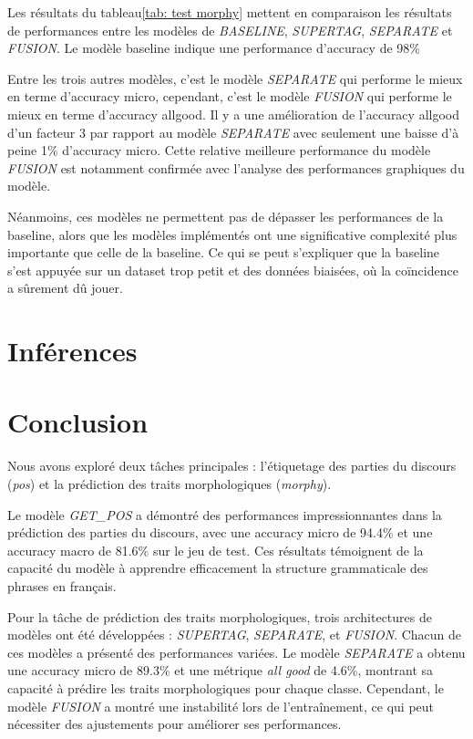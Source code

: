 \documentclass[a4paper]{article}
\begin{document}
Les résultats du tableau\ref{tab: test morphy} mettent en comparaison les résultats de performances entre les modèles de \textit{BASELINE}, \textit{SUPERTAG}, \textit{SEPARATE} et \textit{FUSION}. Le modèle baseline indique une performance d'accuracy de 98\% 

Entre les trois autres modèles, c'est le modèle \textit{SEPARATE} qui performe le mieux en terme d'accuracy micro, cependant, c'est le modèle \textit{FUSION} qui performe le mieux en terme d'accuracy allgood. Il y a une amélioration de l'accuracy allgood d'un facteur 3 par rapport au modèle \textit{SEPARATE} avec seulement une baisse d'à peine 1\% d'accuracy micro. Cette relative meilleure performance du modèle \textit{FUSION} est notamment confirmée avec l'analyse des performances graphiques du modèle. 

Néanmoins, ces modèles ne permettent pas de dépasser les performances de la baseline, alors que les modèles implémentés ont une significative complexité plus importante que celle de la baseline. Ce qui se peut s'expliquer que la baseline s'est appuyée sur un dataset trop petit et des données biaisées, où la coïncidence a sûrement dû jouer. 

\section{Inférences}

\newpage

\section{Conclusion}

Nous avons exploré deux tâches principales : l'étiquetage des parties du discours (\textit{pos}) et la prédiction des traits morphologiques (\textit{morphy}). 

Le modèle \textit{GET\_POS} a démontré des performances impressionnantes dans la prédiction des parties du discours, avec une accuracy micro de 94.4\% et une accuracy macro de 81.6\% sur le jeu de test. Ces résultats témoignent de la capacité du modèle à apprendre efficacement la structure grammaticale des phrases en français.

Pour la tâche de prédiction des traits morphologiques, trois architectures de modèles ont été développées : \textit{SUPERTAG}, \textit{SEPARATE}, et \textit{FUSION}. Chacun de ces modèles a présenté des performances variées. Le modèle \textit{SEPARATE} a obtenu une accuracy micro de 89.3\% et une métrique \textit{all good} de 4.6\%, montrant sa capacité à prédire les traits morphologiques pour chaque classe. Cependant, le modèle \textit{FUSION} a montré une instabilité lors de l'entraînement, ce qui peut nécessiter des ajustements pour améliorer ses performances.
\end{document}
